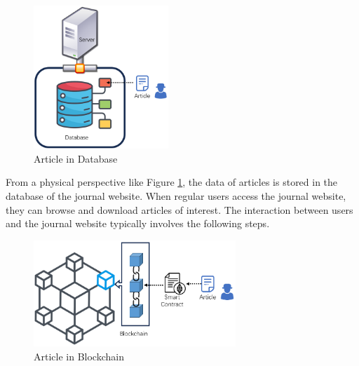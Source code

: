 \documentclass[lettersize,journal]{IEEEtran}
\begin{document}
\begin{figure}[h]
  \centering
  \includegraphics[width=2in]{assets/journalsite.png}
  \caption{Article in Database}
  \label{fig:journalsite}
\end{figure}

From a physical perspective like Figure \ref{fig:journalsite}, the data of articles is stored in the database of the journal website. When regular users access the journal website, they can browse and download articles of interest. The interaction between users and the journal website typically involves the following steps.


\begin{figure}[h]
  \centering
  \includegraphics[width=3in]{assets/journalchain.png}
  \caption{Article in Blockchain}
  \label{fig:journalchain}
\end{figure}
\end{document}
